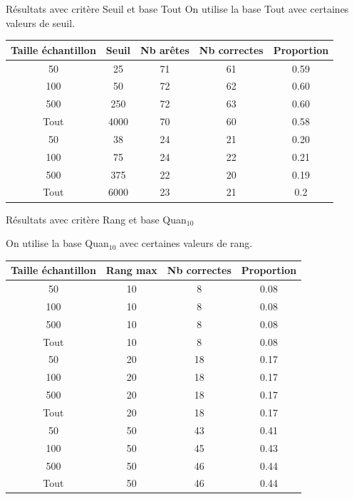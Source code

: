 \documentclass{beamer}
\begin{document}
\begin{frame}{Résultats avec critère Seuil et base Tout}
On utilise la base Tout avec certaines valeurs de seuil.
\begin{tabular}{|c|c|c|c|c|}
   \hline
   Taille échantillon & Seuil & Nb arêtes & Nb correctes & Proportion\\
   \hline
   50 & 25 & 71 & 61 & 0.59  \\
   \hline
   100 & 50 & 72 & 62 & 0.60  \\
   \hline
   500 & 250 & 72 & 63 & 0.60  \\
   \hline
   Tout & 4000 & 70 & 60 & 0.58 \\
   \hline
   50 & 38 & 24 & 21 & 0.20  \\
   \hline
   100 & 75 & 24 & 22 & 0.21  \\
   \hline
   500 & 375 & 22 & 20 & 0.19  \\
   \hline
   Tout & 6000 & 23 & 21 & 0.2 \\
   \hline
\end{tabular}
\end{frame}


\begin{frame}{Résultats avec critère Rang et base Quan$_{10}$}

On utilise la base Quan$_{10}$ avec certaines valeurs de rang.
\begin{tabular}{|c|c|c|c|}
   \hline
   Taille échantillon & Rang max & Nb correctes & Proportion\\
   \hline
   50 & 10  & 8 & 0.08  \\
   \hline
   100 & 10  & 8 & 0.08  \\
   \hline
   500 & 10  & 8 & 0.08  \\
   \hline
   Tout & 10 & 8 & 0.08 \\
   \hline
   50 & 20 & 18 & 0.17  \\
   \hline
   100 & 20 & 18 & 0.17  \\
   \hline
   500 & 20 & 18 & 0.17  \\
   \hline
   Tout & 20 & 18 & 0.17 \\
   \hline
   50 & 50 & 43 & 0.41  \\
   \hline
   100 & 50 & 45 & 0.43  \\
   \hline
   500 & 50 & 46 & 0.44  \\
   \hline
   Tout & 50 & 46 & 0.44 \\
   \hline
\end{tabular}

\end{frame}
\end{document}
